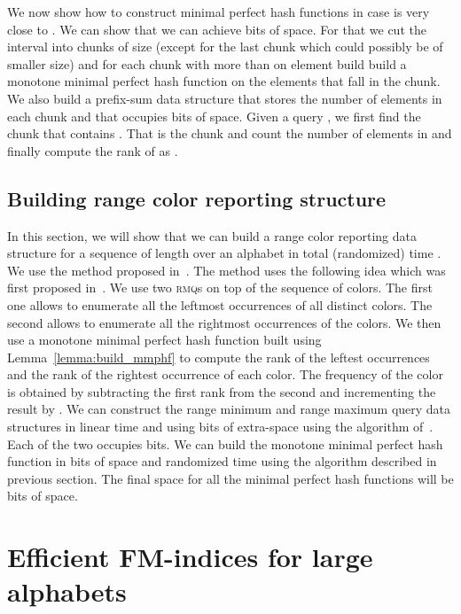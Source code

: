 \documentclass[a4paper]{article}
\begin{document}
\begin{enumerate}
We now show how to construct minimal perfect hash functions in case 
 is very close to . We can show that we can achieve  
bits of space. For that we cut the interval  into  chunks of size 
(except for the last chunk which could possibly be of smaller size) and for each chunk 
 with more than on element build build a monotone minimal perfect hash  function on the
elements that fall in the chunk. We also build a prefix-sum data structure that stores the 
number of elements in each chunk and that occupies  bits of space.
Given a query , we first find the chunk that contains . 
That is the chunk  and count  the number of elements in 
 and finally compute the rank of  as . 
\subsection{Building range color reporting structure}
\label{sec:build_range_color_rep}
In this section, we will show that we can build a range color reporting data structure for 
a sequence of length  over an alphabet  in total (randomized) time . 
We use the method proposed in~\cite{BNV13}. The method uses the following idea which was first proposed
in~\cite{Sa07b}. We use two \textsc{rmq}s on top of the sequence of colors. The first one 
allows to enumerate all the leftmost occurrences of all distinct colors. The second allows to enumerate
all the rightmost occurrences of the colors. We then use a monotone minimal perfect hash function built 
using Lemma~\ref{lemma:build_mmphf} to compute the rank of the leftest occurrences and the rank of the rightest occurrence of each color. 
The frequency of the color is obtained by subtracting the first rank from the second and incrementing 
the result by . 
We can construct the range minimum and range maximum query data structures in linear time 
and using  bits of extra-space using the algorithm 
of~\cite{Fi10}. Each of the two occupies  bits. We can build the monotone minimal 
perfect hash function in  bits of space and randomized  time using 
the algorithm described in previous section. 
The final space for all the minimal perfect hash functions will be  bits
of space. 

\section{Efficient FM-indices for large alphabets}
\label{sec:build_ext_fm_indices}


\end{enumerate}
\end{document}
